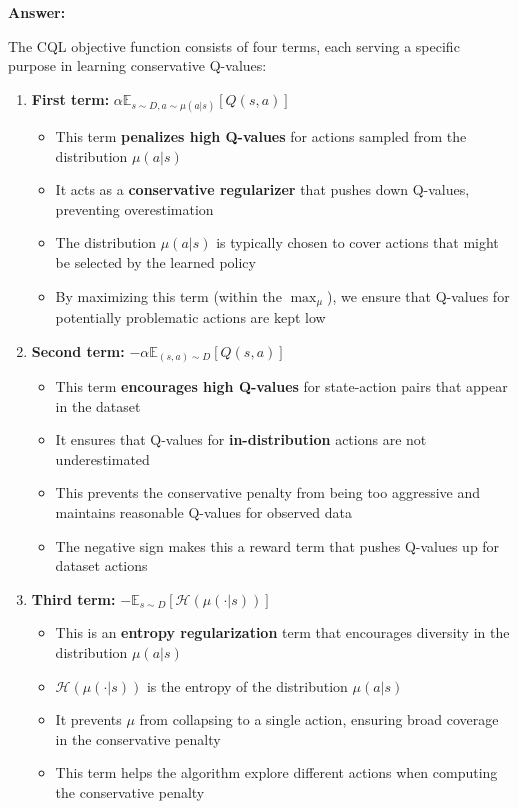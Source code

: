 \documentclass[12pt]{article}
\begin{document}
{{\begin{enumerate}
    \textbf{Answer:}
    
    The CQL objective function consists of four terms, each serving a specific purpose in learning conservative Q-values:
    
    \begin{enumerate}
        \item \textbf{First term:} $\alpha \mathbb{E}_{s \sim D, a \sim \mu(a|s)} [Q(s,a)]$
        \begin{itemize}
            \item This term \textbf{penalizes high Q-values} for actions sampled from the distribution $\mu(a|s)$
            \item It acts as a \textbf{conservative regularizer} that pushes down Q-values, preventing overestimation
            \item The distribution $\mu(a|s)$ is typically chosen to cover actions that might be selected by the learned policy
            \item By maximizing this term (within the $\max_{\mu}$), we ensure that Q-values for potentially problematic actions are kept low
        \end{itemize}
        
        \item \textbf{Second term:} $-\alpha \mathbb{E}_{(s,a) \sim D} [Q(s,a)]$
        \begin{itemize}
            \item This term \textbf{encourages high Q-values} for state-action pairs that appear in the dataset
            \item It ensures that Q-values for \textbf{in-distribution} actions are not underestimated
            \item This prevents the conservative penalty from being too aggressive and maintains reasonable Q-values for observed data
            \item The negative sign makes this a reward term that pushes Q-values up for dataset actions
        \end{itemize}
        
        \item \textbf{Third term:} $-\mathbb{E}_{s \sim D} [\mathcal{H}(\mu(\cdot|s))]$
        \begin{itemize}
            \item This is an \textbf{entropy regularization} term that encourages diversity in the distribution $\mu(a|s)$
            \item $\mathcal{H}(\mu(\cdot|s))$ is the entropy of the distribution $\mu(a|s)$
            \item It prevents $\mu$ from collapsing to a single action, ensuring broad coverage in the conservative penalty
            \item This term helps the algorithm explore different actions when computing the conservative penalty
        \end{itemize}
        

\end{enumerate}
\end{enumerate}}}
\end{document}
